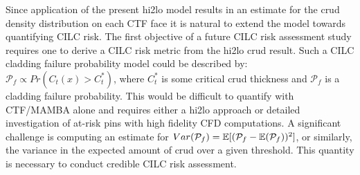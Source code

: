 Since application of the present hi2lo model results in an estimate for the crud density distribution on each CTF face it is natural to extend the model towards quantifying CILC risk.  The first objective of a future CILC risk assessment study requires one to derive a CILC risk metric from the hi2lo crud result.  Such a CILC cladding failure probability model could be described by: $\mathcal P_f \propto Pr(C_t(x) > C_t^*)$, where $C_t^*$ is some critical crud thickness and $\mathcal P_f$ is a cladding failure probability.  This would be difficult to quantify with CTF/MAMBA alone and requires either a hi2lo approach or detailed investigation of at-risk pins with high fidelity CFD computations.  A significant challenge is computing an estimate for $Var(\mathcal P_f) = \operatorname*{\mathbb{E}}[(\mathcal P_f - \operatorname*{\mathbb{E}}(\mathcal P_f))^2]$, or similarly, the variance in the expected amount of crud over a given threshold.  This quantity is necessary to conduct credible CILC risk assessment.
    
    
    
	
	
